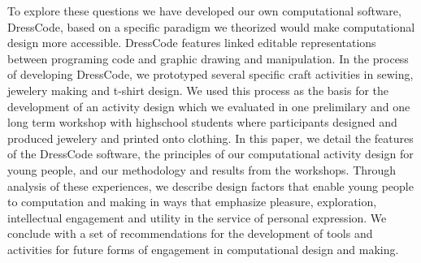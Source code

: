 \documentclass{sigchi}
\begin{document}
To explore these questions we have developed our own computational software, DressCode, based on a specific paradigm we theorized would make computational design more accessible. DressCode features linked editable representations between programing code and graphic drawing and manipulation. In the process of developing DressCode, we prototyped several specific craft activities in sewing, jewelery making and t-shirt design. We used this process as the basis for the development of an activity design which we evaluated in one prelimilary and one long term workshop with highschool students where participants designed and produced jewelery and printed onto clothing. In this paper, we detail the features of the DressCode software, the principles of our computational activity design for young people, and our methodology and results from the workshops. Through analysis of these experiences, we describe design factors that enable young people to computation and making in ways that emphasize pleasure, exploration, intellectual engagement and utility in the service of personal expression. We conclude with a set of recommendations for the development of tools and activities for future forms of engagement in computational design and making.
\end{document}
